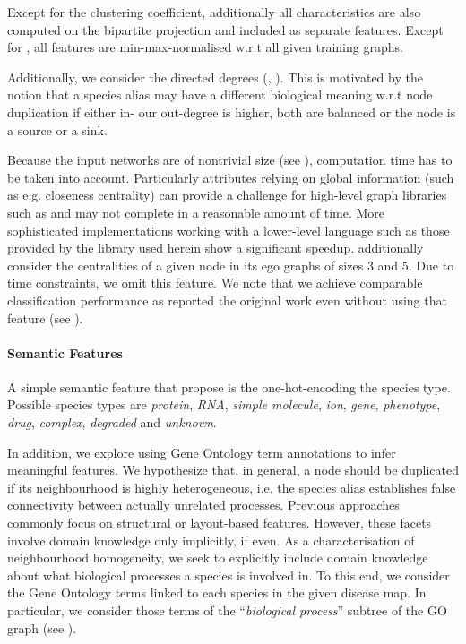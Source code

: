 \documentclass[
	fontsize=10pt, %
	twoside=false, %
	secnumdepth=1, %
  toc=indentunnumbered %
]{kaobook}
\begin{document}
Except for the clustering coefficient, additionally all characteristics are also
computed on the bipartite projection and included as separate features.
Except for , all features are min-max-normalised
w.r.t all given training graphs.


Additionally, we consider the directed degrees (,
). This is motivated by the notion that a species alias may
have a different biological meaning w.r.t node duplication if either in- our
out-degree is higher, both are balanced or the node is a source or a sink.

Because the input networks are of nontrivial size (see ),
computation time has to be taken into account.
% 
Particularly attributes relying on global information (such as e.g. closeness
centrality) can provide a challenge for high-level graph libraries such as
 and may not complete in a reasonable amount of time. More
sophisticated implementations working with a lower-level language such as those
provided by the  library used herein show a significant speedup.
\citeauthor{nielsen_MachineLearningSupport_2019} additionally consider the
centralities of a given node in its ego graphs of sizes $3$ and $5$. Due to time
constraints, we omit this feature. We note that we achieve comparable
classification performance as reported the original work even without using that
feature (see ).



\paragraph{Semantic Features}

A simple semantic feature that \citeauthor{nielsen_MachineLearningSupport_2019}
propose is the one-hot-encoding the species type.
Possible species types are
\textit{protein}, \textit{RNA}, \textit{simple molecule}, \textit{ion},
\textit{gene}, \textit{phenotype}, \textit{drug}, \textit{complex},
\textit{degraded} and \textit{unknown}. 


In addition, we explore using Gene Ontology term annotations to infer meaningful
features.
%
We hypothesize that, in general, a node should be duplicated if its
neighbourhood is highly heterogeneous, i.e. the species alias establishes false
connectivity between actually unrelated processes.
Previous approaches commonly focus on structural or layout-based features.
However, these facets involve domain knowledge only implicitly, if even.
As a characterisation of neighbourhood homogeneity, we seek
to explicitly include domain knowledge about what biological processes a species
is involved in. To this end, we consider the Gene Ontology terms linked to each
species in the given disease map. In particular, we consider those terms of the
``\textit{biological process}'' subtree of the GO graph (see
).
\end{document}
